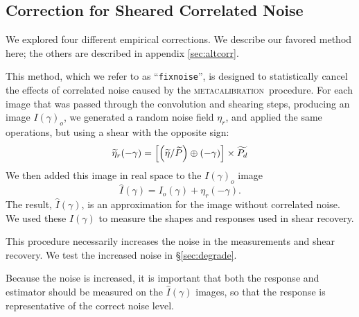 \documentclass[iop, twocolappendix, appendixfloats, numberedappendix, apj]{emulateapj}
\newcommand{\mcal}{\textsc{metacalibration}}
\newcommand{\ntil}{\mbox{$\widetilde{\eta}$}}
\newcommand{\Ptil}{\mbox{$\widetilde{P}$}}
\newcommand{\Ptild}{\mbox{$\widetilde{P_d}$}}
\newcommand{\fixnoise}{\texttt{fixnoise}}
\begin{document}


\subsection{Correction for Sheared Correlated Noise} \label{sec:fixnoise}


We explored four different empirical corrections.  We describe our favored
method here; the others are described in appendix \ref{sec:altcorr}.

This method, which we refer to as ``\fixnoise'', is designed to statistically
cancel the effects of correlated noise caused by the \mcal\ procedure.  For each
image that was passed through the convolution and shearing steps, producing
an image $I(\gamma)_o$, we generated a random noise field
$\eta_r$, and applied the same operations, but using a shear with
the opposite sign:
\begin{equation}
    \widetilde{\eta}_r(-\gamma) = \left[ \left( \ntil/\Ptil \right) \oplus (-\gamma) \right] \times \Ptild  \nonumber \\
\end{equation}
We then added this image in real space to the $I(\gamma)_o$ image
\begin{equation}
    \hat{I}(\gamma) = I_o(\gamma) + \eta_r(-\gamma).
\end{equation}
The result, $\hat{I}(\gamma)$, is an approximation for the image
without correlated noise.
We used these $\hat{I}(\gamma)$ to measure the shapes and responses used in
shear recovery.  

This procedure necessarily increases the noise in the measurements and shear
recovery.  We test the increased noise in \S \ref{sec:degrade}.


Because the noise is increased, it is important that both the response and
estimator should be measured on the $\hat{I}(\gamma)$ images, so that the
response is representative of the correct noise level.
\end{document}
